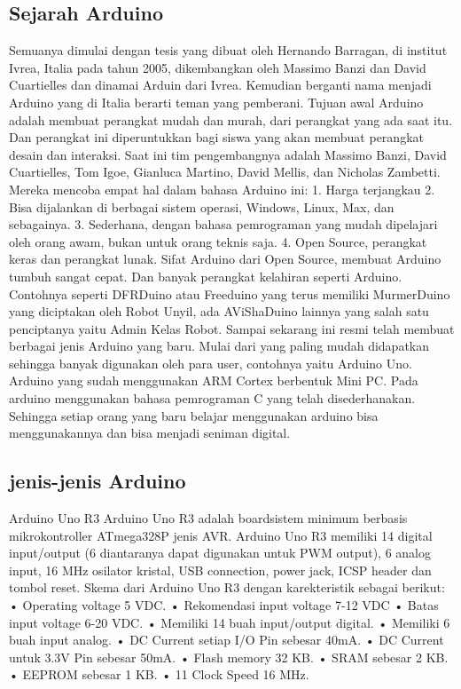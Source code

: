 \subsection{Sejarah Arduino}
Semuanya dimulai dengan tesis yang dibuat oleh Hernando Barragan, di institut Ivrea, Italia pada tahun 2005, dikembangkan oleh Massimo Banzi dan David Cuartielles dan dinamai Arduin dari Ivrea. Kemudian berganti nama menjadi Arduino yang di Italia berarti teman yang pemberani.
Tujuan awal Arduino adalah membuat perangkat mudah dan murah, dari perangkat yang ada saat itu. Dan perangkat ini diperuntukkan bagi siswa yang akan membuat perangkat desain dan interaksi.
Saat ini tim pengembangnya adalah Massimo Banzi, David Cuartielles, Tom Igoe, Gianluca Martino, David Mellis, dan Nicholas Zambetti. Mereka mencoba empat hal dalam bahasa Arduino ini:
1. Harga terjangkau
2. Bisa dijalankan di berbagai sistem operasi, Windows, Linux, Max, dan sebagainya.
3. Sederhana, dengan bahasa pemrograman yang mudah dipelajari oleh orang awam, bukan untuk orang teknis saja.
4. Open Source, perangkat keras dan perangkat lunak.
Sifat Arduino dari Open Source, membuat Arduino tumbuh sangat cepat. Dan banyak perangkat kelahiran seperti Arduino. Contohnya seperti DFRDuino atau Freeduino yang terus memiliki MurmerDuino yang diciptakan oleh Robot Unyil, ada AViShaDuino lainnya yang salah satu penciptanya yaitu Admin Kelas Robot.
Sampai sekarang ini resmi telah membuat berbagai jenis Arduino yang baru. Mulai dari yang paling mudah didapatkan sehingga banyak digunakan oleh para user, contohnya yaitu Arduino Uno. Arduino yang sudah menggunakan ARM Cortex berbentuk Mini PC. Pada arduino menggunakan bahasa pemrograman C yang telah disederhanakan. Sehingga setiap orang yang baru belajar menggunakan arduino bisa menggunakannya dan bisa menjadi seniman digital.

\subsection{jenis-jenis Arduino}
Arduino Uno R3
Arduino Uno R3 adalah boardsistem minimum berbasis mikrokontroller ATmega328P jenis AVR. Arduino Uno R3 memiliki 14 digital input/output (6
diantaranya dapat digunakan untuk PWM output), 6 analog input, 16 MHz osilator kristal, USB connection, power jack, ICSP header dan tombol reset. Skema dari Arduino Uno R3 dengan
karekteristik sebagai berikut:
• Operating voltage 5 VDC.
• Rekomendasi input voltage 7-12
VDC
• Batas input voltage 6-20 VDC.
• Memiliki 14 buah input/output
digital.
• Memiliki 6 buah input analog.
• DC Current setiap I/O Pin sebesar
40mA.
• DC Current untuk 3.3V Pin sebesar
50mA.
• Flash memory 32 KB.
• SRAM sebesar 2 KB.
• EEPROM sebesar 1 KB.
• 11 Clock Speed 16 MHz.

